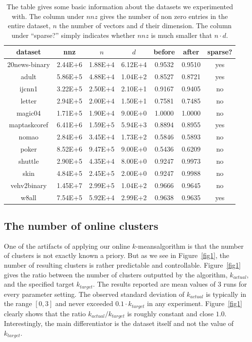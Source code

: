 \documentclass[11pt,twoside]{article}
\newcommand{\kmeans}{$k$-means}
\begin{document}
\begin{table}[htdp]
\begin{center}
\begin{tabular}{|c|c|c|c|c|c|c|} \hline
dataset		&	nnz		& $n$	&	$d$	&	before & after & sparse?			\\ \hline
20news-binary	&	2.44E+6	&	1.88E+4	&	6.12E+4	& 0.9532	& 0.9510	& yes			\\ \hline %
adult			&	5.86E+5	&	4.88E+4	&	1.04E+2	& 0.8527	& 0.8721	& yes			\\ \hline
ijcnn1		&	3.22E+5	&	2.50E+4	&	2.10E+1	& 0.9167	& 0.9405	& no			\\ \hline %
letter			&	2.94E+5	&	2.00E+4	&	1.50E+1	& 0.7581	& 0.7485	&no			\\ \hline
magic04		&	1.71E+5	&	1.90E+4	&	9.00E+0	& 1.0000	& 1.0000	&no		 	\\ \hline
maptaskcoref	&	6.41E+6	&	1.59E+5	&	5.94E+3	& 0.8894  & 0.8955	&yes		 	\\ \hline
nomao		&	2.84E+6	&	3.45E+4	&	1.73E+2	& 0.5846	& 0.5893	&no		 	\\ \hline
poker		&	8.52E+6	&	9.47E+5	&	9.00E+0	& 0.5436	& 0.6209	&no		  	\\ \hline
shuttle		&	2.90E+5	&	4.35E+4	&	8.00E+0	& 0.9247	& 0.9973	&no		 	\\ \hline
skin			&	4.84E+5	&	2.45E+5	&	2.00E+0	& 0.9247	& 0.9988	&no		 	\\ \hline
vehv2binary	&	1.45E+7	&	2.99E+5	&	1.04E+2	& 0.9666	& 0.9645	&no		 	\\ \hline
w8all			&	7.54E+5	&	5.92E+4	&	2.99E+2	& 0.9638	& 0.9635	&yes		 	\\ \hline
\end{tabular}
\end{center}
\caption{The table gives some basic information about the datasets we experimented with. 
The column under $nnz$ gives the number of non zero entries in the entire dataset, $n$ the number of vectors and $d$ their dimension.
The column under ``sparse?'' simply indicates whether $nnz$ is much smaller that $n\cdot d$.}
\label{table1}
\end{table}%

\subsection{The number of online clusters}
One of the artifacts of applying our online \kmeans algorithm is that the number of clusters is not exactly known a priory.
But as we see in Figure~\ref{fig1}, the number of resulting clusters is rather predictable and controllable.
Figure~\ref{fig1} gives the ratio between the number of clusters outputted by the algorithm, $k_{actual}$, and the specified target $k_{target}$.
The results reported are mean values of $3$ runs for every parameter setting. 
The observed standard deviation of $k_{actual}$ is typically in the range $[0,3]$ and never exceeded $0.1\cdot k_{target}$ in any experiment.
Figure~\ref{fig1} clearly shows that the ratio $k_{actual}/k_{target}$ is roughly constant and close $1.0$. 
Interestingly, the main differentiator is the dataset itself and not the value of $k_{target}$.
\end{document}
